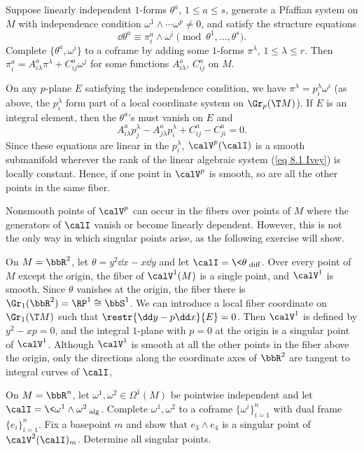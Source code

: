 \begin{example}
    Suppose linearly independent $1$-forms $\theta^a$, $1\leq a\leq s$, generate a Pfaffian system on $M$ with independence condition $\omega^1\wedge\cdots\omega^p\neq 0$, and satisfy the structure equations 
    \[\dd\theta^a\equiv \pi^a_i\wedge\omega^i\pmod{\theta^1,\ldots,\theta^s}.\]
    Complete $\{\theta^a,\omega^i\}$ to a coframe by adding some $1$-forms $\pi^\lambda$, $1\leq\lambda\leq r$. Then $\pi^a_i=A^a_{i\lambda}\pi^\lambda+C^a_{ij}\omega^j$ for some functions $A^a_{i\lambda}$, $C^a_{ij}$ on $M$.

    On any $p$-plane $E$ satisfying the independence condition, we have $\pi^\lambda=p^\lambda_i\omega^i$ (as above, the $p^\lambda_i$ form part of a local coordinate system on $\Gr_p(\T M)$). If $E$ is an integral element, then the $\theta^a$'s must vanish on $E$ and 
    \[A^a_{i\lambda}p^\lambda_j-A^a_{j\lambda}p^\lambda_i+C^a_{ij}-C^a_{ji}=0.\label{eq 8.1 Ivey}\]
    Since these equations are linear in the $p^\lambda_i$, $\calV^p(\calI)$ is a smooth submanifold wherever the rank of the linear algebraic system (\ref{eq 8.1 Ivey}) is locally constant. Hence, if one point in $\calV^p$ is smooth, so are all the other points in the same fiber.
\end{example}


Nonsmooth points of $\calV^p$ can occur in the fibers over points of $M$ where the generators of $\calI$ vanish or become linearly dependent. However, this is not the only way in which singular points arise, as the following exercise will show.


\begin{example}
    On $M=\bbR^2$, let $\theta=y^2\dd x-x\dd y$ and let $\calI=\<\theta\>_{\mathrm{diff}}$. Over every point of $M$ except the origin, the fiber of $\calV^1(M)$ is a single point, and $\calV^1$ is smooth. Since $\theta$ vanishes at the origin, the fiber there is $\Gr_1(\bbR^2)=\RP^1\cong \bbS^1$. We can introduce a local fiber coordinate on $\Gr_1(\T M)$ such that $\restr{\dd y-p\dd x}{E}=0$. Then $\calV^1$ is defined by $y^2-xp=0$, and the integral $1$-plane with $p=0$ at the origin is a singular point of $\calV^1$. Although $\calV^1$ is smooth at all the other points in the fiber above the origin, only the directions along the coordinate axes of $\bbR^2$ are tangent to integral curves of $\calI$,
\end{example}


\begin{example}
    On $M=\bbR^n$, let $\omega^1,\omega^2\in\Omega^1(M)$ be pointwise independent and let $\calI=\<\omega^1\wedge\omega^2\>_{\mathrm{alg}}$. Complete $\omega^1,\omega^2$ to a coframe $\{\omega^i\}_{i=1}^n$ with dual frame $\{e_i\}_{i=1}^n$. Fix a basepoint $m$ and show that $e_3\wedge e_4$ is a singular point of $\calV^2(\calI)_m$. Determine all singular points.
\end{example}

